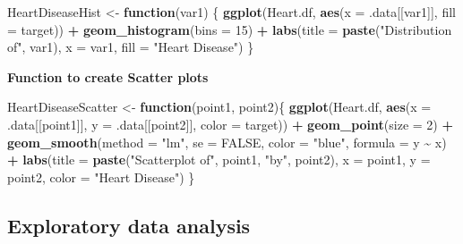 \documentclass[
]{article}
\newenvironment{Shaded}{\begin{snugshade}}{\end{snugshade}}
\newcommand{\AttributeTok}[1]{\textcolor[rgb]{0.13,0.29,0.53}{#1}}
\newcommand{\ConstantTok}[1]{\textcolor[rgb]{0.56,0.35,0.01}{#1}}
\newcommand{\ControlFlowTok}[1]{\textcolor[rgb]{0.13,0.29,0.53}{\textbf{#1}}}
\newcommand{\DecValTok}[1]{\textcolor[rgb]{0.00,0.00,0.81}{#1}}
\newcommand{\FunctionTok}[1]{\textcolor[rgb]{0.13,0.29,0.53}{\textbf{#1}}}
\newcommand{\NormalTok}[1]{#1}
\newcommand{\OtherTok}[1]{\textcolor[rgb]{0.56,0.35,0.01}{#1}}
\newcommand{\SpecialCharTok}[1]{\textcolor[rgb]{0.81,0.36,0.00}{\textbf{#1}}}
\newcommand{\StringTok}[1]{\textcolor[rgb]{0.31,0.60,0.02}{#1}}
\begin{document}
\begin{Shaded}
\begin{Highlighting}[]
\NormalTok{HeartDiseaseHist }\OtherTok{\textless{}{-}} \ControlFlowTok{function}\NormalTok{(var1) \{}
  \FunctionTok{ggplot}\NormalTok{(Heart.df, }\FunctionTok{aes}\NormalTok{(}\AttributeTok{x =}\NormalTok{ .data[[var1]], }\AttributeTok{fill =}\NormalTok{ target)) }\SpecialCharTok{+}
    \FunctionTok{geom\_histogram}\NormalTok{(}\AttributeTok{bins =} \DecValTok{15}\NormalTok{) }\SpecialCharTok{+}
    \FunctionTok{labs}\NormalTok{(}\AttributeTok{title =} \FunctionTok{paste}\NormalTok{(}\StringTok{"Distribution of"}\NormalTok{, var1),}
         \AttributeTok{x =}\NormalTok{ var1, }\AttributeTok{fill =} \StringTok{"Heart Disease"}\NormalTok{)}
\NormalTok{\}}
\end{Highlighting}
\end{Shaded}

\textbf{Function to create Scatter plots}

\begin{Shaded}
\begin{Highlighting}[]
\NormalTok{HeartDiseaseScatter }\OtherTok{\textless{}{-}} \ControlFlowTok{function}\NormalTok{(point1, point2)\{}
  \FunctionTok{ggplot}\NormalTok{(Heart.df, }\FunctionTok{aes}\NormalTok{(}\AttributeTok{x =}\NormalTok{ .data[[point1]],}
                       \AttributeTok{y =}\NormalTok{ .data[[point2]],}
                       \AttributeTok{color =}\NormalTok{ target)) }\SpecialCharTok{+}
    \FunctionTok{geom\_point}\NormalTok{(}\AttributeTok{size =} \DecValTok{2}\NormalTok{) }\SpecialCharTok{+}
    \FunctionTok{geom\_smooth}\NormalTok{(}\AttributeTok{method =} \StringTok{"lm"}\NormalTok{, }\AttributeTok{se =} \ConstantTok{FALSE}\NormalTok{, }\AttributeTok{color =} \StringTok{"blue"}\NormalTok{, }\AttributeTok{formula =}\NormalTok{ y }\SpecialCharTok{\textasciitilde{}}\NormalTok{ x) }\SpecialCharTok{+}
    \FunctionTok{labs}\NormalTok{(}\AttributeTok{title =} \FunctionTok{paste}\NormalTok{(}\StringTok{"Scatterplot of"}\NormalTok{, point1, }\StringTok{"by"}\NormalTok{, point2),}
       \AttributeTok{x =}\NormalTok{ point1, }\AttributeTok{y =}\NormalTok{ point2, }\AttributeTok{color =} \StringTok{"Heart Disease"}\NormalTok{)}
\NormalTok{\}}
\end{Highlighting}
\end{Shaded}

\subsection{Exploratory data analysis}\label{exploratory-data-analysis}
\end{document}

